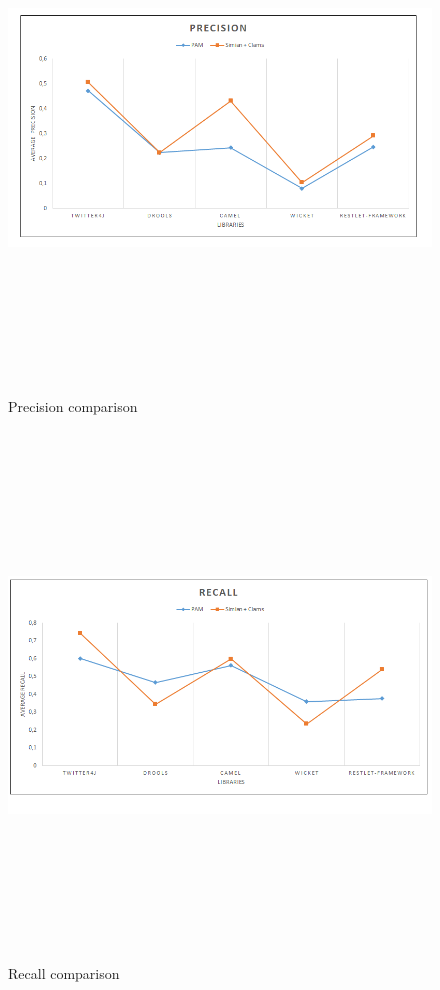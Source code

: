 \begin{figure}[!h]
\includegraphics[width=14cm,height=14cm,keepaspectratio]{images/Precision.png}
\centering
  \caption{Precision comparison}
  \label{fig:cmd}
\end{figure}

\begin{figure}[!h]
\includegraphics[width=14cm,height=14cm,keepaspectratio]{images/Recall.png}
\centering
\caption{Recall comparison}
\label{fig:cmd}
\end{figure}


